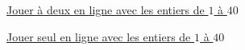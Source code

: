 \begin{enigme}
    \href{http://lozano.maths.free.fr/jeux-serieux/juniperGreen-a2.html}{ Jouer à deux en ligne avec les entiers de $1$ à $40$}

    \href{http://lozano.maths.free.fr/jeux-serieux/juniperGreen-seul.html}{ Jouer seul en ligne avec les entiers de $1$ à $40$}
\end{enigme}

